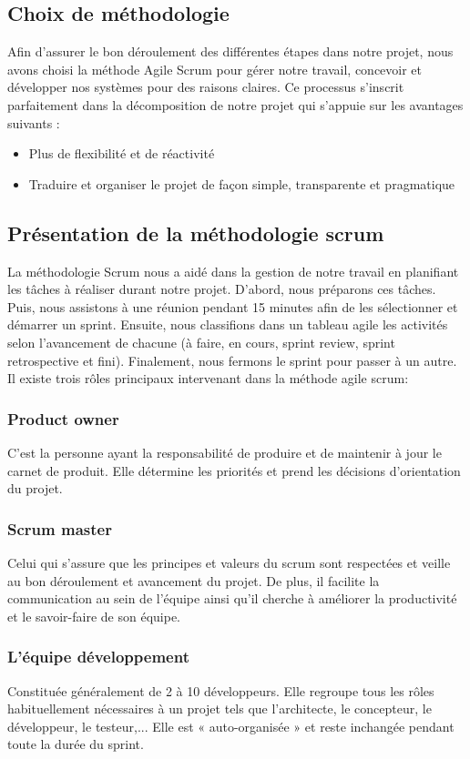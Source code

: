 \subsection{Choix de méthodologie }
Afin d'assurer le bon déroulement des différentes étapes dans notre projet, nous avons choisi la méthode Agile Scrum pour gérer notre travail, concevoir et développer nos systèmes pour des raisons claires. Ce processus  s'inscrit parfaitement dans la décomposition de notre projet qui s'appuie sur les avantages suivants :
\begin{itemize}
	\item Plus de flexibilité et de réactivité
	\item Traduire et organiser le projet de façon simple, transparente et pragmatique
\end{itemize}

\subsection{Présentation de la méthodologie scrum }
La méthodologie Scrum nous a aidé dans la gestion de notre travail en planifiant les tâches à réaliser durant notre projet. D'abord, nous préparons ces tâches. Puis, nous assistons à une réunion pendant 15 minutes afin de les sélectionner et démarrer un sprint. Ensuite, nous classifions dans un tableau agile les activités selon l'avancement de chacune (à faire, en cours, sprint review, sprint retrospective et fini). Finalement, nous fermons le sprint pour passer à un autre.
Il existe trois rôles principaux intervenant dans la méthode agile scrum:
\subsubsection{Product owner }
C'est la personne ayant la responsabilité de produire et de maintenir à jour le carnet de produit. Elle détermine les priorités et prend les décisions d'orientation du projet.
\subsubsection{Scrum master  }
Celui qui s’assure que les principes et valeurs du scrum sont
respectées et veille au bon déroulement et avancement du projet. De plus, il facilite la communication au sein de l’équipe ainsi qu'il cherche à améliorer la productivité et le savoir-faire de son équipe.
\subsubsection{L'équipe développement  }
Constituée généralement de 2 à 10 développeurs. Elle regroupe tous les rôles habituellement nécessaires à un projet tels que l'architecte, le concepteur, le développeur, le testeur,... Elle est « auto-organisée » et reste inchangée pendant toute la durée du sprint.


